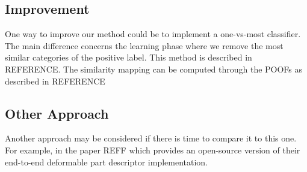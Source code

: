\documentclass[11pt,a4paper,oneside]{report}
\begin{document}
\subsection*{Improvement}

One way to improve our method could be to implement a one-vs-most classifier. The main difference concerns the learning phase where we remove the most similar categories of the positive label. This method is described in REFERENCE. The similarity mapping can be computed through the POOFs as described in REFERENCE

\subsection*{Other Approach}

Another approach may be considered if there is time to compare it to this one. For example, in the paper REFF which provides an open-source version of their end-to-end deformable part descriptor implementation.
\end{document}
